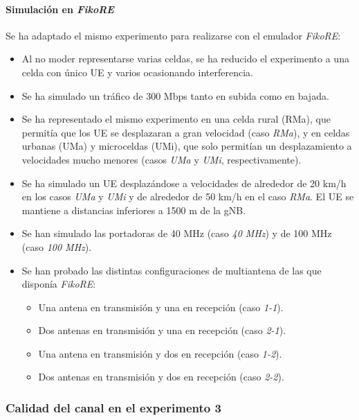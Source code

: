 \documentclass[12pt]{report} %
\begin{document}
\paragraph{Simulación en \textit{FikoRE}}

Se ha adaptado el mismo experimento para realizarse con el emulador \textit{FikoRE}:

\begin{itemize}
\item Al no moder representarse varias celdas, se ha reducido el experimento a una celda con único UE y varios ocasionando interferencia.
\item Se ha simulado un tráfico de 300 Mbps tanto en subida como en bajada.
\item Se ha representado el mismo experimento en una celda rural (RMa), que permitía que los UE se desplazaran a gran velocidad (caso \textit{RMa}), y en celdas urbanas (UMa) y microceldas (UMi), que solo permitían un desplazamiento a velocidades mucho menores (casos \textit{UMa} y \textit{UMi}, respectivamente).
\item Se ha simulado un UE desplazándose a velocidades de alrededor de 20 km/h en los casos \textit{UMa} y \textit{UMi} y de alrededor de 50 km/h en el caso \textit{RMa}.
El UE se mantiene a distancias inferiores a 1500 m de la gNB.
\item Se han simulado las portadoras de 40 MHz (caso \textit{40 MHz}) y de 100 MHz (caso \textit{100 MHz}).
\item {
Se han probado las distintas configuraciones de multiantena de las que disponía \textit{FikoRE}:
\begin{itemize}
\item Una antena en transmisión y una en recepción (caso \textit{1-1}).
\item Dos antenas en transmisión y una en recepción (caso \textit{2-1}).
\item Una antena en transmisión y dos en recepción (caso \textit{1-2}).
\item Dos antenas en transmisión y dos en recepción (caso \textit{2-2}).
\end{itemize}
}
\end{itemize}

\subsubsection{Calidad del canal en el experimento 3}
\end{document}
